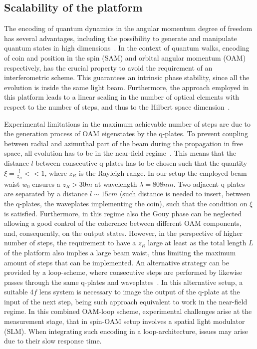 \subsection{Scalability of the platform}
The encoding of quantum dynamics in the angular momentum degree of freedom has several advantages, including the possibility to generate and manipulate quantum states in high dimensions~\cite{fickler2012quantum,dambrosio2013photonic}. In the context of quantum walks, encoding of coin and position in the spin (SAM) and orbital angular momentum (OAM) respectively, has the crucial property to avoid the requirement of an interferometric scheme. This guarantees an intrinsic phase stability, since all the evolution is inside the same light beam. Furthermore, the approach employed in this platform leads to a linear scaling in the number of optical elements with respect to the number of steps, and thus to the Hilbert space dimension~\cite{cardano2015quantum}.

Experimental limitations in the maximum achievable number of steps 
are due to the generation process of OAM eigenstates by the q-plates. To prevent coupling between radial and azimuthal part of the beam during the propagation in free space, all evolution has to be in the near-field regime~\cite{karimi2009light, cardano2015quantum}. This means that the distance $l$ between consecutive q-plates has to be chosen such that the quantity $\xi=\frac{l}{z_R}< < 1 $, where $z_R$ is the Rayleigh range.
In our setup the employed beam waist $w_0$  ensures a $z_R> 30 m$ at wavelength $\lambda=808 nm$. Two adjacent q-plates are separated by a distance $l \sim 15 cm$ (such distance is needed to insert, between the q-plates, the waveplates implementing the coin), such that the condition on $\xi$ is satisfied.  Furthermore, in this regime also the Gouy phase can be neglected allowing a good control of the coherence between different OAM components, and, consequently, on the output states. However, in the perspective of higher number of steps, the requirement to have a $z_R$ large at least as the total length $L$ of the platform also implies a large beam waist, thus limiting the maximum amount of steps that can be implemented. An alternative strategy can be provided by a loop-scheme, where consecutive steps are performed by likewise passes through the same q-plates and waveplates~\cite{goyal2013implementing}. In this alternative setup, a suitable $4f$ lens system is necessary to image the output of the q-plate at the input of the next step, being such approach equivalent to work in the near-field regime.  
In this combined OAM-loop scheme, experimental challenges arise at the measurement stage, that in spin-OAM setup involves a spatial light modulator (SLM). When integrating such encoding in a loop-architecture, issues may arise due to their slow response time.


